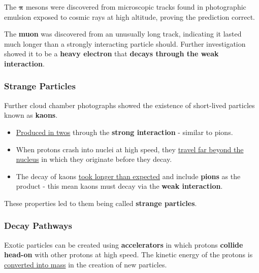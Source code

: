 The $\mathbf{\pi}$ mesons were discovered from microscopic tracks found in photographic emulsion exposed to cosmic rays at high altitude, proving the prediction correct.

The \textbf{muon} was discovered from an unusually long track, indicating it lasted much longer than a strongly interacting particle should. Further investigation showed it to be a \textbf{heavy electron} that \textbf{decays through the weak interaction}.

\subsubsection*{Strange Particles}

Further cloud chamber photographs showed the existence of short-lived particles known as \textbf{kaons}.
\begin{itemize}
    \item \underline{Produced in twos} through the \textbf{strong interaction} - similar to pions.
    \item When protons crash into nuclei at high speed, they \underline{travel far beyond the nucleus} in which they originate before they decay.
    \item The decay of kaons \underline{took longer than expected} and include \textbf{pions} as the product - this mean kaons must decay via the \textbf{weak interaction}.
\end{itemize}
These properties led to them being called \textbf{strange particles}.

\subsubsection*{Decay Pathways}

Exotic particles can be created using \textbf{accelerators} in which protons \textbf{collide head-on} with other protons at high speed. The kinetic energy of the protons is \underline{converted into mass} in the creation of new particles.

